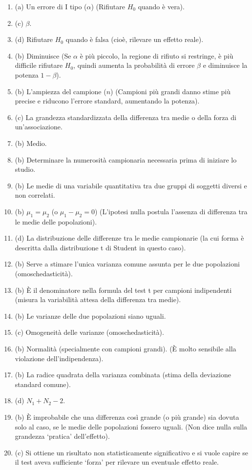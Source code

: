 \documentclass[12pt, a4paper]{article}
\newcommand{\alphaerr}{\alpha} %
\newcommand{\betaerr}{\beta}  %
\newcommand{\Hnull}{H_0} %
\begin{document}
\begin{enumerate}[leftmargin=*, label=\arabic*.]
    \item (a) Un errore di I tipo ($\alphaerr$) (Rifiutare $\Hnull$ quando è vera).
    \item (c) $\betaerr$.
    \item (d) Rifiutare $\Hnull$ quando è falsa (cioè, rilevare un effetto reale).
    \item (b) Diminuisce (Se $\alphaerr$ è più piccolo, la regione di rifiuto si restringe, è più difficile rifiutare $\Hnull$, quindi aumenta la probabilità di errore $\betaerr$ e diminuisce la potenza $1-\betaerr$).
    \item (b) L'ampiezza del campione ($n$) (Campioni più grandi danno stime più precise e riducono l'errore standard, aumentando la potenza).
    \item (c) La grandezza standardizzata della differenza tra medie o della forza di un'associazione.
    \item (b) Medio.
    \item (b) Determinare la numerosità campionaria necessaria prima di iniziare lo studio.
    \item (b) Le medie di una variabile quantitativa tra due gruppi di soggetti diversi e non correlati.
    \item (b) $\mu_1 = \mu_2$ (o $\mu_1 - \mu_2 = 0$) (L'ipotesi nulla postula l'assenza di differenza tra le medie delle popolazioni).
    \item (d) La distribuzione delle differenze tra le medie campionarie (la cui forma è descritta dalla distribuzione t di Student in questo caso).
    \item (b) Serve a stimare l'unica varianza comune assunta per le due popolazioni (omoschedasticità).
    \item (b) È il denominatore nella formula del test t per campioni indipendenti (misura la variabilità attesa della differenza tra medie).
    \item (b) Le varianze delle due popolazioni siano uguali.
    \item (c) Omogeneità delle varianze (omoschedasticità).
    \item (b) Normalità (specialmente con campioni grandi). (È molto sensibile alla violazione dell'indipendenza).
    \item (b) La radice quadrata della varianza combinata (stima della deviazione standard comune).
    \item (d) $N_1 + N_2 - 2$.
    \item (b) È improbabile che una differenza così grande (o più grande) sia dovuta solo al caso, se le medie delle popolazioni fossero uguali. (Non dice nulla sulla grandezza   `pratica' dell'effetto).
    \item (c) Si ottiene un risultato non statisticamente significativo e si vuole capire se il test aveva sufficiente   `forza' per rilevare un eventuale effetto reale.
\end{enumerate}
\end{document}
